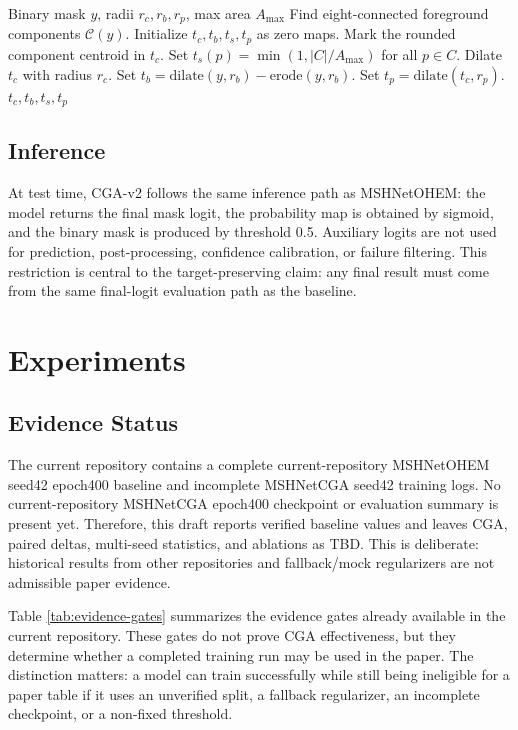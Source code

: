 \documentclass[letterpaper]{article}
\begin{document}
\begin{algorithm}[t]
\caption{Training-time CGA-v2 target construction}
\label{alg:cga}
\begin{algorithmic}[1]
\REQUIRE Binary mask $y$, radii $r_c,r_b,r_p$, max area $A_{\max}$
\STATE Find eight-connected foreground components $\mathcal{C}(y)$.
\STATE Initialize $t_c,t_b,t_s,t_p$ as zero maps.
  \STATE Mark the rounded component centroid in $t_c$.
  \STATE Set $t_s(p)=\min(1, |C|/A_{\max})$ for all $p \in C$.
\ENDFOR
\STATE Dilate $t_c$ with radius $r_c$.
\STATE Set $t_b=\mathrm{dilate}(y,r_b)-\mathrm{erode}(y,r_b)$.
\STATE Set $t_p=\mathrm{dilate}(t_c,r_p)$.
\RETURN $t_c,t_b,t_s,t_p$
\end{algorithmic}
\end{algorithm}

\subsection{Inference}

At test time, CGA-v2 follows the same inference path as MSHNetOHEM: the model returns the final mask logit, the probability map is obtained by sigmoid, and the binary mask is produced by threshold 0.5. Auxiliary logits are not used for prediction, post-processing, confidence calibration, or failure filtering. This restriction is central to the target-preserving claim: any final result must come from the same final-logit evaluation path as the baseline.

\section{Experiments}

\subsection{Evidence Status}

The current repository contains a complete current-repository MSHNetOHEM seed42 epoch400 baseline and incomplete MSHNetCGA seed42 training logs. No current-repository MSHNetCGA epoch400 checkpoint or evaluation summary is present yet. Therefore, this draft reports verified baseline values and leaves CGA, paired deltas, multi-seed statistics, and ablations as TBD. This is deliberate: historical results from other repositories and fallback/mock regularizers are not admissible paper evidence.

Table \ref{tab:evidence-gates} summarizes the evidence gates already available in the current repository. These gates do not prove CGA effectiveness, but they determine whether a completed training run may be used in the paper. The distinction matters: a model can train successfully while still being ineligible for a paper table if it uses an unverified split, a fallback regularizer, an incomplete checkpoint, or a non-fixed threshold.
\end{document}

